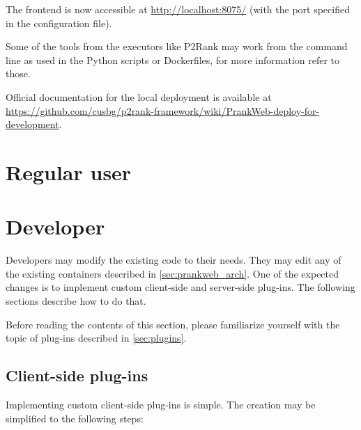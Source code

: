 The frontend is now accessible at \url{http://localhost:8075/} (with the port specified in the configuration file).

Some of the tools from the executors like P2Rank may work from the command line as used in the Python scripts or Dockerfiles, for more information refer to those.

Official documentation for the local deployment is available at \url{https://github.com/cusbg/p2rank-framework/wiki/PrankWeb-deploy-for-development}.


\section{Regular user}
\label{sec:regular_user}

\section{Developer}
\label{sec:developer}

Developers may modify the existing code to their needs. They may edit any of the existing containers described in \cref{sec:prankweb_arch}. One of the expected changes is to implement custom client-side and server-side plug-ins. The following sections describe how to do that.

Before reading the contents of this section, please familiarize yourself with the topic of plug-ins described in \cref{sec:plugins}.

\subsection{Client-side plug-ins}
\label{subsec:dev_client_side}

Implementing custom client-side plug-ins is simple. The creation may be simplified to the following steps:

